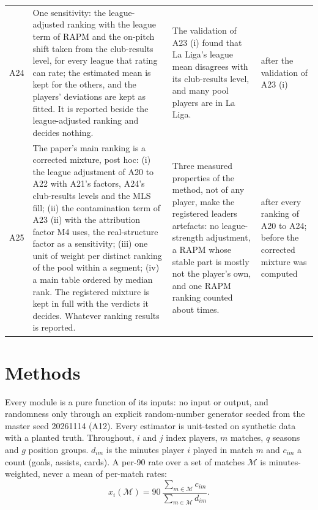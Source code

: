 \documentclass[11pt,a4paper]{article}
\begin{document}
{\begin{longtable}{@{}L{0.7cm}L{6.9cm}L{4.6cm}L{2.1cm}@{}}
A24 & One sensitivity: the league-adjusted ranking with the league term of RAPM and the on-pitch shift taken from the club-results level, for every league that rating can rate; the estimated mean is kept for the others, and the players' deviations are kept as fitted. It is reported beside the league-adjusted ranking and decides nothing. & The validation of A23 (i) found that La Liga's league mean disagrees with its club-results level, and many pool players are in La Liga. & after the validation of A23 (i) \\
A25 & The paper's main ranking is a corrected mixture, post hoc: (i) the league adjustment of A20 to A22 with A21's factors, A24's club-results levels and the MLS fill; (ii) the contamination term of A23 (ii) with the attribution factor M4 uses, the real-structure factor as a sensitivity; (iii) one unit of weight per distinct ranking of the pool within a segment; (iv) a main table ordered by median rank. The registered mixture is kept in full with the verdicts it decides. Whatever ranking results is reported. & Three measured properties of the method, not of any player, make the registered leaders artefacts: no league-strength adjustment, a RAPM whose stable part is mostly not the player's own, and one RAPM ranking counted about \ImpactRepeatMean{} times. & after every ranking of A20 to A24; before the corrected mixture was computed \\
\end{longtable}
}

\section{Methods}
\label{sec:methods}

Every module is a pure function of its inputs: no input or output, and
randomness only through an explicit random-number generator seeded from the
master seed 20261114 (A12). Every estimator is unit-tested on synthetic data
with a planted truth. Throughout, $i$ and $j$ index players, $m$ matches, $q$
seasons and $g$ position groups. $d_{im}$ is the minutes player $i$ played in
match $m$ and $c_{im}$ a count (goals, assists, cards). A per-90 rate over a set
of matches $\mathcal M$ is minutes-weighted, never a mean of per-match rates:
\begin{equation}
  x_i(\mathcal M) = 90\, \frac{\sum_{m \in \mathcal M} c_{im}}{\sum_{m \in \mathcal M} d_{im}}.
  \label{eq:rate}
\end{equation}
\end{document}
